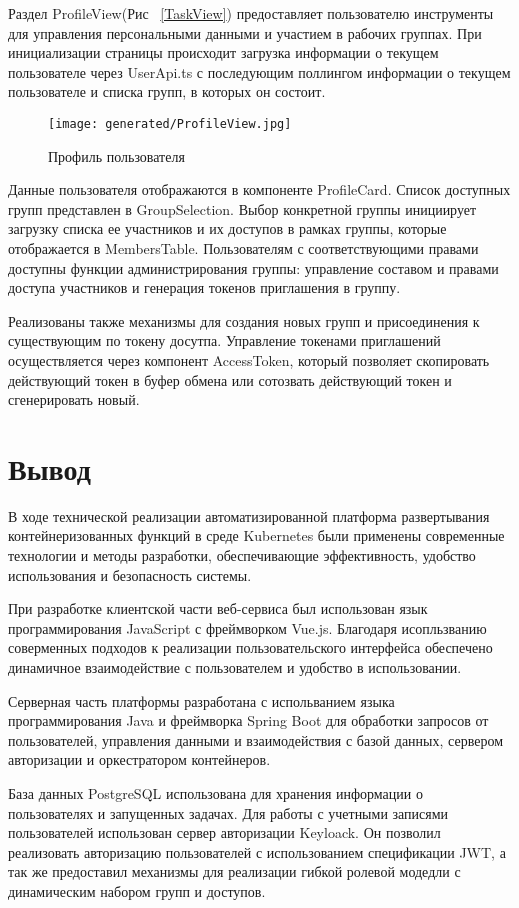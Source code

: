 Раздел ProfileView(Рис ~\ref{TaskView}) предоставляет пользователю инструменты для управления персональными данными и участием в рабочих группах.
При инициализации страницы происходит загрузка информации о текущем пользователе через UserApi.ts с последующим поллингом информации о текущем пользователе и списка групп, в которых он состоит.

\begin{figure*}[!t]
  \centering
  \texttt{[image: generated/ProfileView.jpg]}
  \caption{Профиль пользователя}
  \label{ProfileView}
\end{figure*}

Данные пользователя отображаются в компоненте ProfileCard.
Список доступных групп представлен в GroupSelection.
Выбор конкретной группы инициирует загрузку списка ее участников и их доступов в рамках группы, которые отображается в MembersTable.
Пользователям с соответствующими правами доступны функции администрирования группы: управление составом и правами доступа участников и генерация токенов приглашения в группу.

Реализованы также механизмы для создания новых групп и присоединения к существующим по токену досутпа.
Управление токенами приглашений осуществляется через компонент AccessToken, который позволяет скопировать действующий токен в буфер обмена или сотозвать действующий токен и сгенерировать новый.

\section{Вывод}

В ходе технической реализации автоматизированной платформа развертывания контейнеризованных функций в среде Kubernetes были применены современные технологии и методы разработки, обеспечивающие эффективность, удобство использования и безопасность системы.

При разработке клиентской части веб-сервиса был использован язык программирования JavaScript с фреймворком Vue.js.  Благодаря исопльзванию соверменных подходов к реализации пользовательского интерфейса обеспечено динамичное взаимодействие с пользователем и удобство в использовании.

Серверная часть платформы разработана с испольванием языка программирования Java и фреймворка Spring Boot для обработки запросов от пользователей, управления данными и взаимодействия с базой данных, сервером авторизации и оркестратором контейнеров.

База данных PostgreSQL использована для хранения информации о пользователях и запущенных задачах. Для работы с учетными записями пользователей использован сервер авторизации Keyloack. Он позволил реализовать авторизацию пользователей с использованием спецификации JWT, а так же предоставил механизмы для реализации гибкой ролевой модедли с динамическим набором групп и доступов.

